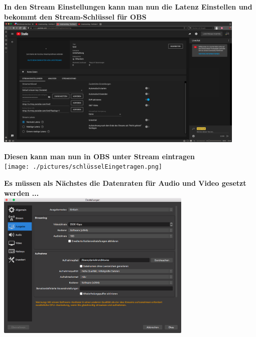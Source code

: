 \newpage
\begin{center}
  \textbf{In den Stream Einstellungen kann man nun die Latenz Einstellen und bekommt den Stream-Schlüssel für OBS} \\
  {\vspace{0.3cm}}
  \includegraphics[width=0.9\textwidth]{./pictures/YOUTUBEstreamPlanen3.png}
\end{center}

\begin{center}
  \textbf{Diesen kann man nun in OBS unter Stream eintragen} \\
  {\vspace{0.3cm}}
  \texttt{[image: ./pictures/schlüsselEingetragen.png]}
\end{center}

\newpage
\begin{center}
  \textbf{Es müssen als Nächstes die Datenraten für Audio und Video gesetzt werden ...} \\
  {\vspace{0.3cm}}
  \includegraphics[width=0.7\textwidth]{./pictures/configDatenRate.png}
\end{center}

